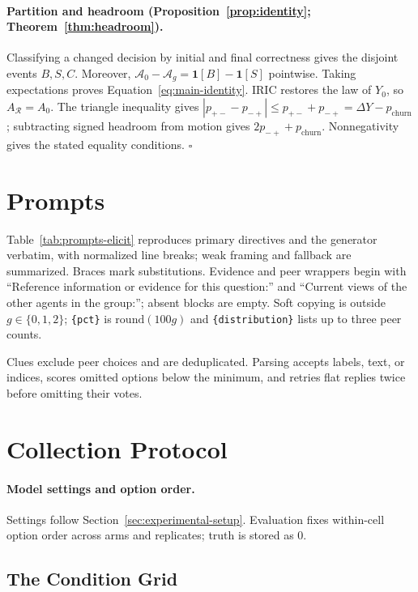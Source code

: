 \documentclass[11pt,a4paper]{article}
\theoremstyle{definition}
\newcommand{\pbreak}{p_{+-}}
\newcommand{\prescue}{p_{-+}}
\newcommand{\pchurn}{p_{\mathrm{churn}}}
\begin{document}
\paragraph{Partition and headroom (Proposition~\ref{prop:identity}; Theorem~\ref{thm:headroom}).}
Classifying a changed decision by initial and final correctness gives the
disjoint events $B,S,C$. Moreover,
$\mathcal A_0-\mathcal A_g=\mathbf1[B]-\mathbf1[S]$ pointwise.
Taking expectations proves Equation~\ref{eq:main-identity}. IRIC restores
the law of $Y_0$, so $A_{\mathcal R}=A_0$. The triangle inequality gives
$|\pbreak-\prescue|\le\pbreak+\prescue=\Delta Y-\pchurn$;
subtracting signed headroom from motion gives $2\prescue+\pchurn$.
Nonnegativity gives the stated equality conditions. \hfill$\square$

\section{Prompts}
\label{sec:app-prompts}
\label{sec:app-prompts-evidence}
\label{sec:app-prompts-copying}

Table~\ref{tab:prompts-elicit} reproduces primary directives and the generator verbatim, with normalized line breaks; weak framing and fallback are summarized. Braces mark substitutions. Evidence and peer wrappers begin with ``Reference information or evidence for this question:'' and ``Current views of the other agents in the group:''; absent blocks are empty. Soft copying is outside $g\in\{0,1,2\}$; \texttt{\{pct\}} is $\mathrm{round}(100g)$ and \texttt{\{distribution\}} lists up to three peer counts.

Clues exclude peer choices and are deduplicated. Parsing accepts labels, text, or indices, scores omitted options below the minimum, and retries flat replies twice before omitting their votes.

\section{Collection Protocol}
\label{sec:app-protocol}

\paragraph{Model settings and option order.}

Settings follow Section~\ref{sec:experimental-setup}. Evaluation fixes
within-cell option order across arms and replicates; truth is stored as $0$.

\subsection{The Condition Grid}
\label{sec:app-conditions}
\end{document}
